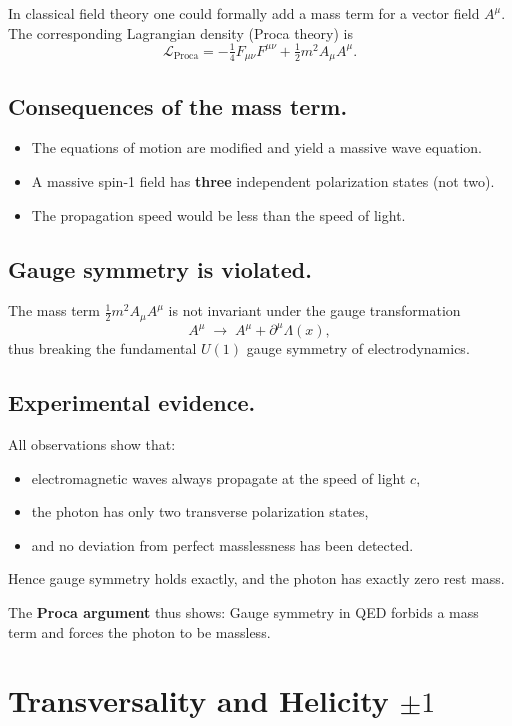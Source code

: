 In classical field theory one could formally add a mass term for a vector field \( A^\mu \).
The corresponding Lagrangian density (Proca theory) is
\[
\mathcal{L}_{\text{Proca}} = -\tfrac{1}{4} F_{\mu\nu} F^{\mu\nu} 
+ \tfrac{1}{2} m^2 A_\mu A^\mu .
\]

\subsection*{Consequences of the mass term.}
\begin{itemize}
	\item The equations of motion are modified and yield a massive wave equation.
	\item A massive spin-1 field has \textbf{three} independent polarization states (not two).
	\item The propagation speed would be less than the speed of light.
\end{itemize}

\subsection*{Gauge symmetry is violated.}
The mass term \( \tfrac{1}{2} m^2 A_\mu A^\mu \) 
is not invariant under the gauge transformation
\[
A^\mu \;\to\; A^\mu + \partial^\mu \Lambda(x),
\]
thus breaking the fundamental \(U(1)\) gauge symmetry of electrodynamics.

\subsection*{Experimental evidence.}
All observations show that:
\begin{itemize}
	\item electromagnetic waves always propagate at the speed of light \(c\),
	\item the photon has only two transverse polarization states,
	\item and no deviation from perfect masslessness has been detected.
\end{itemize}
Hence gauge symmetry holds exactly, and the photon has exactly zero rest mass.

\medskip
The \textbf{Proca argument} thus shows:  
Gauge symmetry in QED forbids a mass term and forces the photon to be massless.

\section{Transversality and Helicity \( \pm 1 \)}
\label{anhangA:transversalitaet}

